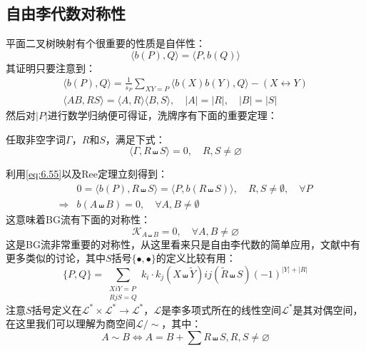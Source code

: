 \subsection{自由李代数对称性}
平面二叉树映射有个很重要的性质是自伴性：
\begin{equation}
	\label{eq:6.55}
	\langle b(P),Q\rangle=\langle P,b(Q)\rangle
\end{equation}
其证明只要注意到：
\begin{equation}
\begin{gathered}
		\langle b(P),Q\rangle=\frac{1}{s_P}\sum_{XY=P}\langle b(X)b(Y),Q\rangle-(X\leftrightarrow Y)\\
	\langle AB,RS\rangle=\langle A,R\rangle\langle B,S\rangle,\quad|A|=|R|,\quad|B|=|S|
\end{gathered}
\end{equation}
然后对$|P|$进行数学归纳便可得证，洗牌序有下面的重要定理：
\begin{boxedtext}[Ree定理]
	任取非空字词$\Gamma$，$R$和$S$，满足下式：
	\begin{equation}
		\langle\Gamma,R\shuffle S\rangle=0,\quad R,S\neq\varnothing
	\end{equation}
\end{boxedtext}
利用\ref{eq:6.55}以及Ree定理立刻得到：
\begin{equation}
\begin{aligned}
	\label{eq:6.58}
		&0=\langle b(P),R\shuffle S\rangle=\langle P,b(R\shuffle S)\rangle,\quad R,S\neq\emptyset,\quad\forall P\\
	\Rightarrow &b(A\shuffle B)=0,\quad\forall A,B\neq\emptyset
\end{aligned}
\end{equation}
这意味着BG流有下面的对称性：
\begin{equation}
	\mathcal{K}_{A\shuffle B}=0,\quad\forall A,B\neq\varnothing
\end{equation}
这是BG流非常重要的对称性，从这里看来只是自由李代数的简单应用，文献\cite{Frost:2020eoa}中有更多类似的讨论，其中$S$括号$\{\bullet,\bullet\}$的定义比较有用：
\begin{equation}
	\{P,Q\}=\sum_{\substack{XiY=P\\{ { {RjS=Q}}}}}k_i\cdot k_j(X \shuffle\tilde{Y})ij(\tilde{R} \shuffle S)(-1)^{|Y|+|R|}
\end{equation}
注意$S$括号定义在$\mathcal{L}^*\times \mathcal{L}^*\to\mathcal{L}^*$，$\mathcal{L}$是李多项式所在的线性空间$\mathcal{L}^*$是其对偶空间，在这里我们可以理解为商空间$\mathcal{L}/\sim$，其中：
\begin{equation}
	A\sim B\Leftrightarrow A=B+\sum R\shuffle  S,R,S\neq\varnothing
\end{equation}
